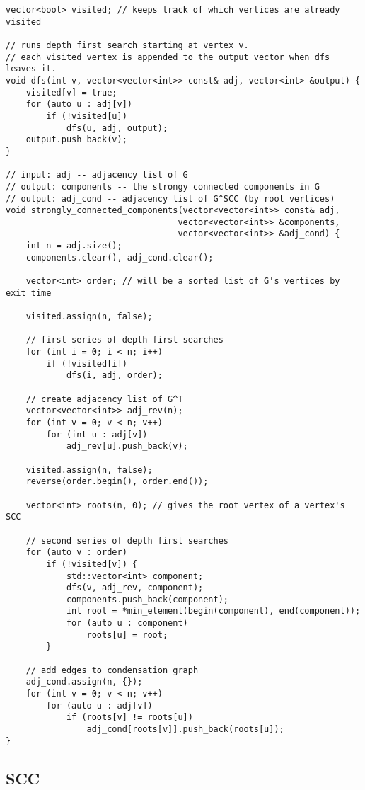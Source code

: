 \documentclass[10pt]{article}
\begin{document}
\begin{multicols*}{2}
\begin{lstlisting}[style=compactcpp]
vector<bool> visited; // keeps track of which vertices are already visited

// runs depth first search starting at vertex v.
// each visited vertex is appended to the output vector when dfs leaves it.
void dfs(int v, vector<vector<int>> const& adj, vector<int> &output) {
    visited[v] = true;
    for (auto u : adj[v])
        if (!visited[u])
            dfs(u, adj, output);
    output.push_back(v);
}

// input: adj -- adjacency list of G
// output: components -- the strongy connected components in G
// output: adj_cond -- adjacency list of G^SCC (by root vertices)
void strongly_connected_components(vector<vector<int>> const& adj,
                                  vector<vector<int>> &components,
                                  vector<vector<int>> &adj_cond) {
    int n = adj.size();
    components.clear(), adj_cond.clear();

    vector<int> order; // will be a sorted list of G's vertices by exit time

    visited.assign(n, false);

    // first series of depth first searches
    for (int i = 0; i < n; i++)
        if (!visited[i])
            dfs(i, adj, order);

    // create adjacency list of G^T
    vector<vector<int>> adj_rev(n);
    for (int v = 0; v < n; v++)
        for (int u : adj[v])
            adj_rev[u].push_back(v);

    visited.assign(n, false);
    reverse(order.begin(), order.end());

    vector<int> roots(n, 0); // gives the root vertex of a vertex's SCC

    // second series of depth first searches
    for (auto v : order)
        if (!visited[v]) {
            std::vector<int> component;
            dfs(v, adj_rev, component);
            components.push_back(component);
            int root = *min_element(begin(component), end(component));
            for (auto u : component)
                roots[u] = root;
        }

    // add edges to condensation graph
    adj_cond.assign(n, {});
    for (int v = 0; v < n; v++)
        for (auto u : adj[v])
            if (roots[v] != roots[u])
                adj_cond[roots[v]].push_back(roots[u]);
}
\end{lstlisting}

\subsection{SCC}


\end{multicols*}
\end{document}
